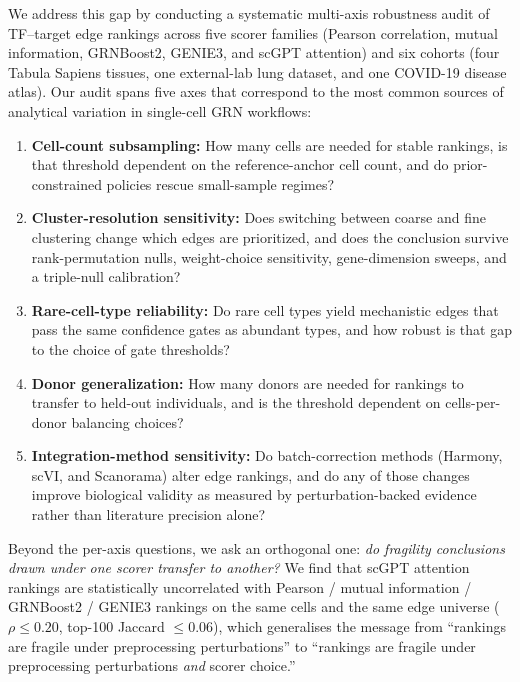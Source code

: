 \documentclass[unnumsec,webpdf,contemporary,large,namedate]{oup-authoring-template}
\begin{document}
We address this gap by conducting a systematic multi-axis robustness audit
of TF--target edge rankings across five scorer families (Pearson correlation,
mutual information, GRNBoost2, GENIE3, and scGPT attention) and six cohorts
(four Tabula Sapiens tissues, one external-lab lung dataset, and one
COVID-19 disease atlas). Our audit spans
five axes that correspond to the most common sources of analytical variation
in single-cell GRN workflows:

\begin{enumerate}
\item \textbf{Cell-count subsampling:} How many cells are needed for stable
      rankings, is that threshold dependent on the reference-anchor cell
      count, and do prior-constrained policies rescue small-sample regimes?
\item \textbf{Cluster-resolution sensitivity:} Does switching between coarse
      and fine clustering change which edges are prioritized, and does the
      conclusion survive rank-permutation nulls, weight-choice sensitivity,
      gene-dimension sweeps, and a triple-null calibration?
\item \textbf{Rare-cell-type reliability:} Do rare cell types yield
      mechanistic edges that pass the same confidence gates as abundant
      types, and how robust is that gap to the choice of gate thresholds?
\item \textbf{Donor generalization:} How many donors are needed for rankings
      to transfer to held-out individuals, and is the threshold dependent
      on cells-per-donor balancing choices?
\item \textbf{Integration-method sensitivity:} Do batch-correction
      methods (Harmony, scVI, and Scanorama) alter edge rankings, and do
      any of those changes improve biological validity as measured by
      perturbation-backed evidence rather than literature precision alone?
\end{enumerate}

Beyond the per-axis questions, we ask an orthogonal one: \emph{do
fragility conclusions drawn under one scorer transfer to another?}
We find that scGPT attention rankings are statistically uncorrelated
with Pearson / mutual information / GRNBoost2 / GENIE3 rankings on the
same cells and the same edge universe ($\rho \leq 0.20$, top-100
Jaccard $\leq 0.06$), which generalises the message from ``rankings
are fragile under preprocessing perturbations'' to ``rankings are
fragile under preprocessing perturbations \emph{and} scorer choice.''
\end{document}
